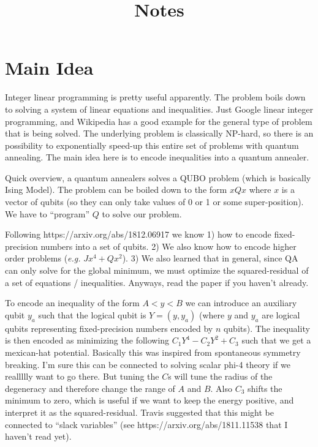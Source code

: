 \documentclass[]{article}
\author{}
\title{Notes}
\begin{document}
\maketitle

\section{Main Idea}

Integer linear programming is pretty useful apparently. The problem boils down to solving a system of linear equations and inequalities. Just Google linear integer programming, and Wikipedia has a good example for the general type of problem that is being solved. The underlying problem is classically NP-hard, so there is an possibility to exponentially speed-up this entire set of problems with quantum annealing. The main idea here is to encode inequalities into a quantum annealer.

Quick overview, a quantum annealers solves a QUBO problem (which is basically Ising Model). The problem can be boiled down to the form $x Q x$ where $x$ is a vector of qubits (so they can only take values of 0 or 1 or some super-position). We have to ``program'' $Q$ to solve our problem.

Following https://arxiv.org/abs/1812.06917 we know 1) how to encode fixed-precision numbers into a set of qubits. 2) We also know how to encode higher order problems (\textit{e.g.} $J x^4 + Q x^2$). 3)  We also learned that in general, since QA can only solve for the global minimum, we must optimize the squared-residual of a set of equations / inequalities. Anyways, read the paper if you haven't already.

To encode an inequality of the form $A < y < B$ we can introduce an auxiliary qubit $y_a$ such that the logical qubit is $Y = (y, y_a)$ (where $y$ and $y_a$ are logical qubits representing fixed-precision numbers encoded by $n$ qubits). The inequality is then encoded as minimizing the following $C_1 Y^4 - C_2 Y^2 + C_3$ such that we get a mexican-hat potential. Basically this was inspired from spontaneous symmetry breaking. I'm sure this can be connected to solving scalar phi-4 theory if we reallllly want to go there. But tuning the $C$s will tune the radius of the degeneracy and therefore change the range of $A$ and $B$.  Also $C_3$ shifts the minimum to zero, which is useful if we want to keep the energy positive, and interpret it as the squared-residual. Travis suggested that this might be connected to ``slack variables'' (see https://arxiv.org/abs/1811.11538 that I haven't read yet).
\end{document}
